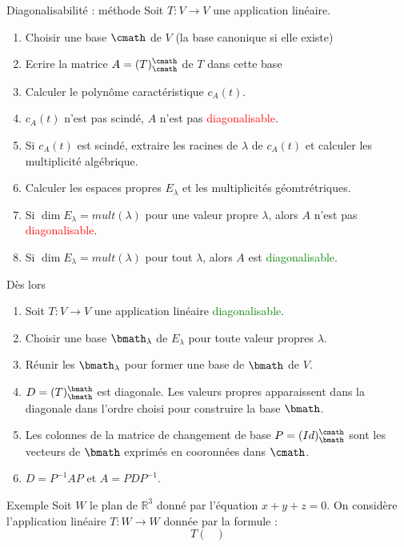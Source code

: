 \begin{parag}{Diagonalisabilité : méthode}
    Soit $T : V \to V$ une application linéaire.
    \begin{enumerate}
        \item Choisir une base $\cmath$ de $V$ (la base canonique si elle existe)
        \item Ecrire la matrice $A = (T)_{\cmath}^\cmath$ de $T$ dans cette base
        \item Calculer le polynôme caractéristique $c_A(t)$.
        \item $c_A(t)$ n'est pas scindé, $A$ n'est pas \textcolor{red}{diagonalisable}.
        \item Si $c_A(t)$ est scindé, extraire les racines de $\lambda$ de $c_A(t)$ et calculer les multiplicité algébrique.
        \item Calculer les espaces propres $E_\lambda$ et les multiplicités géomtrétriques.
        \item Si $\dim E_\lambda = mult(\lambda)$ pour une valeur propre $\lambda$, alors $A$ n'est pas \textcolor{red}{diagonalisable}.
        \item Si $\dim E_\lambda = mult(\lambda)$ pour tout $\lambda$, alors $A$ est \textcolor{green}{diagonalisable}.
    \end{enumerate}
    Dès lors
    \begin{enumerate}
        \item Soit $T : V \to V$ une application linéaire \textcolor{green}{diagonalisable}.
        \item Choisir une base $\bmath_\lambda$ de $E_\lambda$ pour toute valeur propres $\lambda$.
        \item Réunir les $\bmath_\lambda$ pour former une base de $\bmath$ de $V$.
        \item $D = (T)_\bmath^\bmath$ est diagonale. Les valeurs propres apparaissent dans la diagonale dans l'ordre choisi pour construire la base $\bmath$.
        \item Les colonnes de la matrice de changement de base $P = (Id)_\bmath^\cmath$ sont les vecteurs de $\bmath$ exprimés en cooronnées dans $\cmath$.
        \item $D = P^{-1}AP$ et $A = PDP^{-1}$.
    \end{enumerate}
    \begin{subparag}{Exemple}
        Soit $W$ le plan de $\mathbb{R}^3$ donné par l'équation $x + y + z = 0$. On considère l'application linéaire $T: W \to W$ donnée par la formule :
        \[T\begin{pmatrix}

\end{pmatrix}\]
\end{subparag}
\end{parag}
